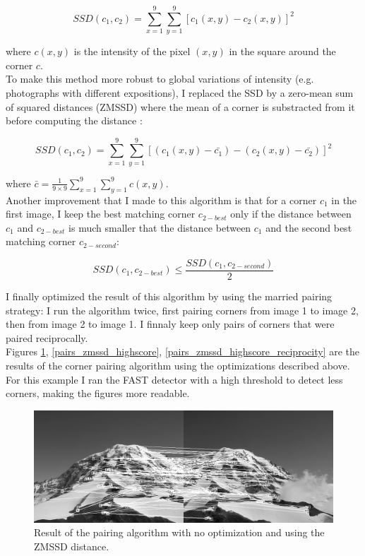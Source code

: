 \documentclass[a4paper,twocolumn]{article}
\begin{document}
$$
SSD(c_1, c_2) = \sum_{x = 1}^{9} \sum_{y = 1}^{9} \left[c_1(x, y) - c_2(x, y)\right]^2
$$

where $c(x,y)$ is the intensity of the pixel $(x,y)$ in the square around the corner $c$.
\\

To make this method more robust to global variations of intensity (e.g. photographs with different expositions), I replaced the SSD by a zero-mean sum of squared distances (ZMSSD) where the mean of a corner is substracted from it before computing the distance :

$$
SSD(c_1, c_2) = \sum_{x = 1}^{9} \sum_{y = 1}^{9} \left[(c_1(x, y) - \bar{c_1}) - (c_2(x, y) - \bar{c_2})\right]^2
$$

where $\bar{c} = \frac{1}{9\times9} \sum_{x = 1}^{9} \sum_{y = 1}^{9} c(x,y)$.
\\

Another improvement that I made to this algorithm is that for a corner $c_1$ in the first image, I keep the best matching corner $c_{2-best}$ only if the distance between $c_1$ and $c_{2-best}$ is much smaller that the distance between $c_1$ and the second best matching corner $c_{2-second}$:

$$
SSD(c_1, c_{2-best}) \le \frac{SSD(c_1, c_{2-second})}{2}
$$

I finally optimized the result of this algorithm by using the married pairing strategy: I run the algorithm twice, first pairing corners from image 1 to image 2, then from image 2 to image 1. I finnaly keep only pairs of corners that were paired reciprocally.
\\

Figures \ref{pairs_zmssd}, \ref{pairs_zmssd_highscore}, \ref{pairs_zmssd_highscore_reciprocity} are the results of the corner pairing algorithm using the optimizations described above. For this example I ran the FAST detector with a high threshold to detect less corners, making the figures more readable.

\begin{figure}[h!]
\vspace{1cm}
\centering\includegraphics[width=\textwidth]{images/pairs_zmssd.png}
\caption{Result of the pairing algorithm with no optimization and using the ZMSSD distance.}
\label{pairs_zmssd}
\end{figure}
\end{document}
